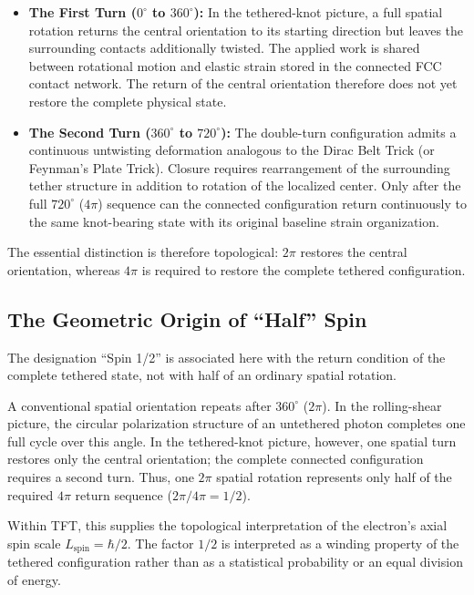 \begin{itemize}
    \item \textbf{The First Turn ($0^{\circ}$ to $360^{\circ}$):} In the tethered-knot picture, a full spatial rotation returns the central orientation to its starting direction but leaves the surrounding contacts additionally twisted. The applied work is shared between rotational motion and elastic strain stored in the connected FCC contact network. The return of the central orientation therefore does not yet restore the complete physical state.
    \item \textbf{The Second Turn ($360^{\circ}$ to $720^{\circ}$):} The double-turn configuration admits a continuous untwisting deformation analogous to the Dirac Belt Trick (or Feynman's Plate Trick). Closure requires rearrangement of the surrounding tether structure in addition to rotation of the localized center. Only after the full $720^{\circ}$ ($4\pi$) sequence can the connected configuration return continuously to the same knot-bearing state with its original baseline strain organization.
\end{itemize}

The essential distinction is therefore topological: $2\pi$ restores the central orientation, whereas $4\pi$ is required to restore the complete tethered configuration.

\subsection{The Geometric Origin of ``Half'' Spin}

The designation ``Spin 1/2'' is associated here with the return condition of the complete tethered state, not with half of an ordinary spatial rotation.

A conventional spatial orientation repeats after $360^{\circ}$ ($2\pi$). In the rolling-shear picture, the circular polarization structure of an untethered photon completes one full cycle over this angle. In the tethered-knot picture, however, one spatial turn restores only the central orientation; the complete connected configuration requires a second turn. Thus, one $2\pi$ spatial rotation represents only half of the required $4\pi$ return sequence ($2\pi/4\pi = 1/2$). 

Within TFT, this supplies the topological interpretation of the electron's axial spin scale $L_{\mathrm{spin}} = \hbar/2$. The factor $1/2$ is interpreted as a winding property of the tethered configuration rather than as a statistical probability or an equal division of energy.

